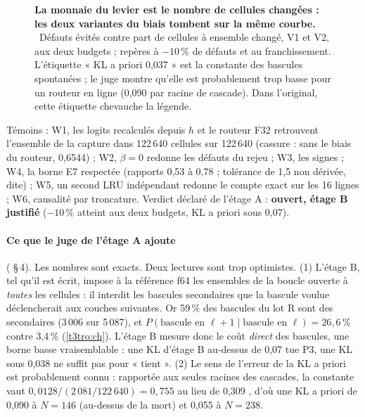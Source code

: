 \begin{figure}[tbp]
\centering
{}
\caption[P3, étage A : défauts évités contre cellules changées]{\textbf{La monnaie du levier est le nombre de cellules changées : les deux variantes du biais tombent sur la même courbe.} \mes~Défauts évités contre part de cellules à ensemble changé, V1 et V2, aux deux budgets ; repères à $-10\,\%$ de défauts et au franchissement. L'étiquette « KL a priori 0,037 » est la constante des bascules spontanées ; le juge montre qu'elle est probablement trop basse pour un routeur en ligne (0,090 par racine de cascade). Dans l'original, cette étiquette chevauche la légende. \HorsStyle{}}
\label{fig:t3-mim-p3-pareto}
\end{figure}

Témoins \mes : W1, les logits recalculés depuis $h$ et le routeur F32 retrouvent l'ensemble de la capture dans 122\,640 cellules sur 122\,640 (cassure : sans le biais du routeur, 0,6544) ; W2, $\beta = 0$ redonne les défauts du rejeu ; W3, les signes ; W4, la borne E7 respectée (rapports 0,53 à 0,78 ; tolérance de 1,5 non dérivée, dite) ; W5, un second LRU indépendant redonne le compte exact sur les 16 lignes ; W6, causalité par troncature. Verdict déclaré de l'étage A : \textbf{ouvert, étage B justifié} ($-10\,\%$ atteint aux deux budgets, KL a priori sous 0,07).

\paragraph{Ce que le juge de l'étage A ajoute} ( §\,4). Les nombres sont exacts. Deux lectures sont trop optimistes. (1) L'étage B, tel qu'il est écrit, impose à la référence f64 les ensembles de la boucle ouverte à \emph{toutes} les cellules : il interdit les bascules secondaires que la bascule voulue déclencherait aux couches suivantes. Or 59\,\% des bascules du lot R sont des secondaires (3\,006 sur 5\,087), et $P(\text{bascule en } \ell+1 \mid \text{bascule en } \ell) = 26{,}6\,\%$ contre 3,4\,\% (\cref{t3tro:ch}). L'étage B mesure donc le coût \emph{direct} des bascules, une borne basse vraisemblable : une KL d'étage B au-dessus de 0,07 tue P3, une KL sous 0,038 ne suffit pas pour « tient ». (2) Le sens de l'erreur de la KL a priori est probablement connu : rapportée aux seules racines des cascades, la constante vaut $0{,}0128/(2\,081/122\,640) = 0{,}755$ au lieu de 0,309 \calc, d'où une KL a priori de 0,090 à $N = 146$ (au-dessus de la mort) et 0,055 à $N = 238$.

